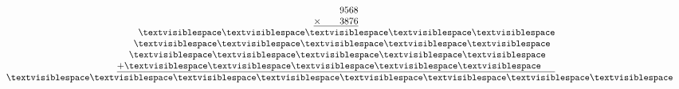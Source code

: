 \begin{minipage}[t]{0.3\linewidth}
\begin{align*}\begin{array}{c}
\phantom{
\times0000
}
9568\\
\underline{
\times
\phantom{
0000
}
3876
}\\
\phantom{
+000
}
\textvisiblespace
\textvisiblespace
\textvisiblespace
\textvisiblespace
\textvisiblespace
\\
\phantom{
+00
}
\textvisiblespace
\textvisiblespace
\textvisiblespace
\textvisiblespace
\textvisiblespace
\phantom0\\
\phantom{
+0
}
\textvisiblespace
\textvisiblespace
\textvisiblespace
\textvisiblespace
\textvisiblespace
\phantom0\phantom0\\
\underline{
+
\textvisiblespace
\textvisiblespace
\textvisiblespace
\textvisiblespace
\textvisiblespace
\phantom0\phantom0\phantom0
}
\\
\phantom{+}
\textvisiblespace
\textvisiblespace
\textvisiblespace
\textvisiblespace
\textvisiblespace
\textvisiblespace
\textvisiblespace
\textvisiblespace
\end{array}\end{align*}
\end{minipage}
\begin{minipage}[t]{0.05\linewidth}
\begin{align*}\begin{array}{c}
\textvisiblespace
\\
\textvisiblespace
\\
\textvisiblespace
\\
\textvisiblespace
\\
\textvisiblespace
\\
\textvisiblespace
\\
\textvisiblespace
\end{array}\end{align*}
\end{minipage}
\begin{minipage}[t]{0.05\linewidth}
\begin{align*}\begin{array}{c}
\textvisiblespace
\\
\textvisiblespace
\\
\textvisiblespace
\\
\textvisiblespace
\\
\textvisiblespace
\\
\textvisiblespace
\\
\textvisiblespace
\end{array}\end{align*}
\end{minipage}
